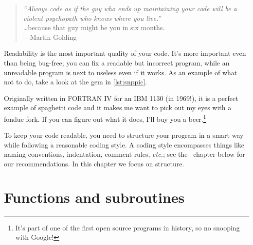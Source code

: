 \label{chap:Structure}

\begin{quote}\small
  \emph{``Always code as if the guy who ends up maintaining your code will be a violent psychopath who knows where you live.''} \\ \ldots because that guy might be you in six months. \\ \hspace*{\fill}---Martin Golding
\end{quote}
Readability is the most important quality of your code.
It's more important even than being bug-free; you can fix a readable but incorrect program, while an unreadable program is next to useless even if it works.
As an example of what not to do, take a look at the gem in \autoref{lst:snppic}.

Originally written in FORTRAN IV for an IBM 1130 (in 1969!), it is a perfect example of spaghetti code and it makes me want to pick out my eyes with a fondue fork.
If you can figure out what it does, I'll buy you a beer.\footnote{It's part of one of the first open source programs in history, so no snooping with Google!}

To keep your code readable, you need to structure your program in a smart way while following a reasonable coding style.
A coding style encompasses things like naming conventions, indentation, comment rules, \emph{etc.}; see the ~chapter below for our recommendations.
In this chapter we focus on structure.

\section{Functions and subroutines}

